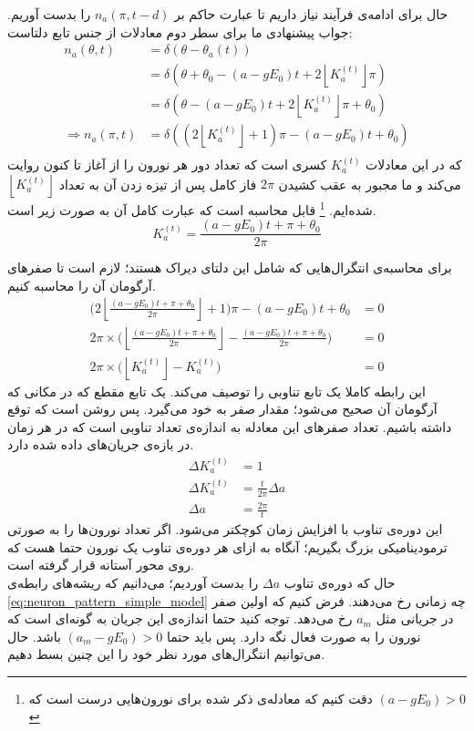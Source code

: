 \documentclass[12pt,onecolumn,a4paper]{article}
\newcommand{\floor}[1]{\left\lfloor #1 \right\rfloor}
\begin{document}
حال برای ادامه‌ی فرآیند نیاز داریم تا عبارت حاکم بر 
$n_a(\pi,t-d)$
را بدست آوریم. جواب پیشنهادی ما برای سطر دوم معادلات از جنس تابع دلتاست:
\begin{align}
n_a(\theta,t) &= \delta(\theta - \theta_a(t)) \\
&= \delta(\theta + \theta_0 - (a - g E_0)t + 2 \floor{K^{(t)}_a}\pi )\\
&= \delta( \theta - (a - g E_0)t + 2 \floor{K^{(t)}_a} \pi + \theta_0  )\\
\Rightarrow n_a(\pi,t) &= \delta(  (2\floor{K^{(t)}_a} + 1)\pi - (a - g E_0)t + \theta_0   )\\
\end{align}
که در این معادلات 
$K^{(t)}_a$
کسری است که تعداد دور هر نورون را از آغاز تا کنون روایت می‌کند و ما مجبور به عقب کشیدن 
$2\pi$
فاز کامل پس از تیزه زدن آن به تعداد 
$\floor{K^{(t)}_a}$
شده‌ایم.
\footnote{دقت کنیم که معادله‌ی ذکر شده برای نورون‌هایی درست است که 
$(a - g E_0) > 0 $
}
  قابل محاسبه است که عبارت کامل آن به صورت زیر است.
\begin{equation}
K^{(t)}_a = \frac{(a - gE_0)t + \pi + \theta_0}{2\pi}
\end{equation}

برای محاسبه‌ی انتگرال‌هایی که شامل این دلتای دیراک هستند؛ لازم است تا صفر‌های آرگومان آن را محاسبه کنیم.
\begin{align}
\big( 2 \floor{\frac{(a - gE_0)t + \pi + \theta_0}{2\pi}} + 1 \big)\pi - (a - g E_0)t + \theta_0 &= 0\\
2\pi \times \bigg( \floor{\frac{(a - gE_0)t + \pi + \theta_0}{2\pi}}  - \frac{(a - gE_0)t + \pi + \theta_0}{2\pi} \bigg) &= 0\\
2\pi \times \bigg( \floor{K^{(t)}_a} - K^{(t)}_a \bigg) &= 0  \label{eq:neuron_pattern_simple_model}
\end{align}
این رابطه کاملا یک تابع تناوبی را توصیف می‌کند. یک تابع مقطع که در مکانی که آرگومان آن صحیح می‌شود؛ مقدار صفر به خود می‌گیرد. پس روشن است که توقع داشته باشیم. تعداد صفرهای این معادله به اندازه‌ی تعداد تناوبی است که در هر زمان در بازه‌ی جریان‌های داده شده دارد.
\begin{align}
\Delta K^{(t)}_a  &= 1\\
\Delta K^{(t)}_a &= \frac{t}{2\pi}\Delta a\\
\Delta a &= \frac{2\pi}{t}
\end{align}
این دوره‌ی تناوب با افزایش زمان کوچکتر می‌شود. اگر تعداد نورون‌ها را به صورتی ترمودینامیکی بزرگ بگیریم؛ آنگاه به ازای هر دوره‌ی تناوب یک نورون حتما هست که روی محور آستانه قرار گرفته است.\\
حال که دوره‌ی تناوب 
$\Delta a$
را بدست آوردیم؛ می‌دانیم که ریشه‌های رابطه‌ی 
\ref{eq:neuron_pattern_simple_model}
چه زمانی رخ می‌دهند. فرض کنیم که اولین صفر در جریانی مثل
$a_m$
رخ می‌دهد. توجه کنید حتما اندازه‌ی این جریان به گونه‌ای است که نورون را به صورت فعال نگه دارد. پس باید حتما
$(a_m - g E_0) > 0 $
باشد.
 حال می‌توانیم انتگرال‌های مورد نظر خود را این چنین بسط دهیم.
\end{document}
